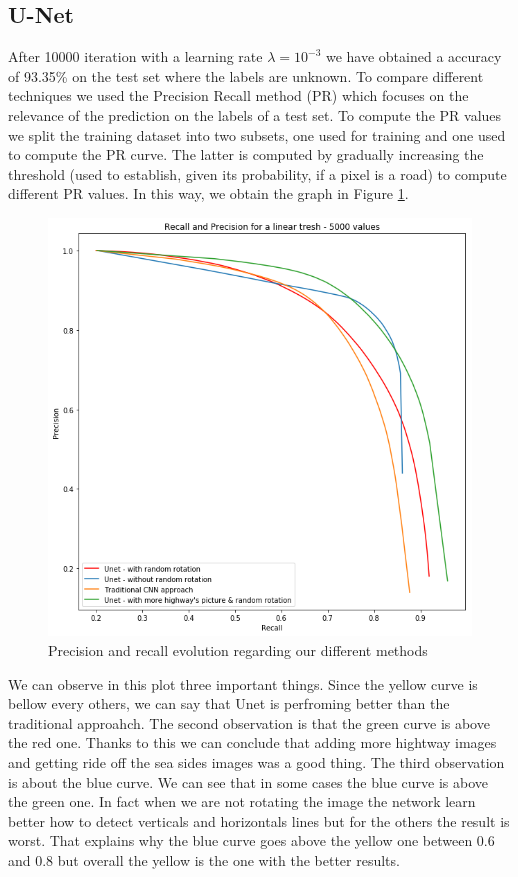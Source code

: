 \documentclass[10pt,conference,compsocconf]{IEEEtran}
\begin{document}
\subsection{U-Net}
	After 10000 iteration with a learning rate $\lambda = 10^{-3}$ we have obtained a accuracy of 93.35\% on the test set where the labels are unknown.
	To compare different techniques we used the Precision Recall method (PR) which focuses on the relevance of the prediction on the labels of a test set. To compute the PR values we split the training dataset into two subsets, one used for training and one used to compute the PR curve. The latter is computed by gradually increasing the threshold (used to establish, given its probability, if a pixel is a road) to compute different PR values. In this way, we obtain the graph in Figure \ref{fig:pr}.
	\begin{figure}[h]
		\centering
		\includegraphics[width=0.8\columnwidth]{img/pr_curve.png}
		\caption{Precision and recall evolution regarding our different methods}
		\label{fig:pr}
	\end{figure}
	We can observe in this plot three important things. Since the yellow curve is bellow every others, we can say that Unet is perfroming better than the traditional approahch. The second observation is that the green curve is above the red one. Thanks to this we can conclude that adding more hightway images and getting ride off the sea sides images was a good thing. The third observation is about the blue curve. We can see that in some cases the blue curve is above the green one. In fact when we are not rotating the image the network learn better how to detect verticals and horizontals lines but for the others the result is worst. That explains why the blue curve goes above the yellow one between 0.6 and 0.8 but overall the yellow is the one with the better results.
\end{document}
